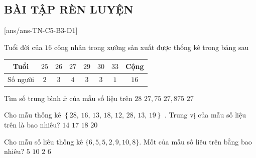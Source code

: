 \subsection{BÀI TẬP RÈN LUYỆN}
 
\setcounter{ex}{0}
[ans/ans-TN-C5-B3-D1]
\begin{ex}%
	Tuổi đời của $16$ công nhân trong xưởng sản xuất được thống kê trong bảng sau
	\begin{center}
		\begin{tabular}{|c|c|c|c|c|c|c|c|}
			\hline Tuổi & $25$ & $26$ & $27$ & $29$ & $30$ & $33$ & Cộng \\
			\hline Số người & $2$ & $3$ & $4$ & $3$ & $3$ & $1$ & $16$ \\
			\hline
		\end{tabular}
	\end{center}
	Tìm số trung bình $\overline{x}$ của mẫu số liệu trên
	\choice
	{$28$}
	{$27{,}75$}
	{\True $27{,}875$}
	{$27$}
\end{ex}

\begin{ex}%
	Cho mẫu thống kê $\left\{28,\,16,\,13,\,18,\,12,\,28,\,13,\,19\right\}$ . Trung vị của mẫu số liệu trên là bao nhiêu?
	\choice
	{$14$}
	{\True $17$}
	{$18$}
	{$20$}
\end{ex}

\begin{ex}%
	Cho mẫu số liêu thống kê $\{6, 5, 5, 2, 9, 10, 8\}$. Mốt của mẫu số liêu trên bằng bao nhiêu?
	\choice
	{\True $5$}
	{$10$}
	{$2$}
	{$6$}
\end{ex}

